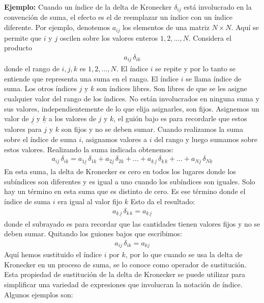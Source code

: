 \noindent
\textbf{Ejemplo:} Cuando un índice de la delta de Kronecker $\delta_{ij}$ está involucrado en la convención de suma, el efecto es el de reemplazar un índice con un índice diferente. Por ejemplo, denotemos $a_{ij}$ los elementos de una matriz $N \times N$. Aquí se permite que $i$ y $j$ oscilen sobre los valores enteros $1, 2, \ldots , N$. Considera el producto
\begin{align*}
a_{ij} \, \delta_{ik}
\end{align*}
donde el rango de $i, j, k$ es $1, 2, \ldots , N$. El índice $i$ se repite y por lo tanto se entiende que representa una suma en el rango. El índice $i$ se llama índice de suma. Los otros índices $j$ y $k$ son índices libres. Son libres de que se les asigne cualquier valor del rango de los índices. No están involucrados en ninguna suma y sus valores, independientemente de lo que elija asignarles, son fijos. Asignemos un valor de $\underline{j}$ y $\underline{k}$ a los valores de $j$ y $k$, el guión bajo es para recordarle que estos valores para $j$ y $k$ son fijos y no se deben sumar. Cuando realizamos la suma sobre el índice de suma $i$, asignamos valores a $i$ del rango y luego sumamos sobre estos valores. Realizando la suma indicada obtenemos:
\begin{align*}
a_{i \underline{j}} \, \delta_{i \underline{k}} = a_{1 \underline{j}} \, \delta_{1 \underline{k}} + a_{2 \underline{j}} \, \delta_{2 \underline{k}} + \ldots + a_{\underline{k} \, \underline{j}} \, \delta_{\underline{k} \, \underline{k}} + \ldots + a_{N \underline{j}} \, \delta_{N \underline{k}}
\end{align*}
En esta suma, la delta de Kronecker es cero en todos los lugares donde los subíndices son diferentes y es igual a uno cuando los subíndices son iguales. Solo hay un término en esta suma que es distinto de cero. Es ese término donde el índice de suma $i$ era igual al valor fijo $k$ Esto da el resultado:
\begin{align*}
    a_{\underline{k} \, \underline{j}} \, \delta_{k \, k} = a_{\underline{k} \, \underline{j}}
\end{align*}
donde el subrayado es para recordar que las cantidades tienen valores fijos y no se deben sumar. Quitando los guiones bajos que escribimos:
\begin{align*}
    a_{ij} \, \delta_{i k} = a_{k j}
\end{align*}
Aquí hemos sustituido el índice $i$ por $k$, por lo que cuando se usa la delta de Kronecker en un proceso de suma, se lo conoce como operador de sustitución. Esta propiedad de sustitución de la delta de Kronecker se puede utilizar para simplificar una variedad de expresiones que involucran la notación de índice. Algunos ejemplos son:
